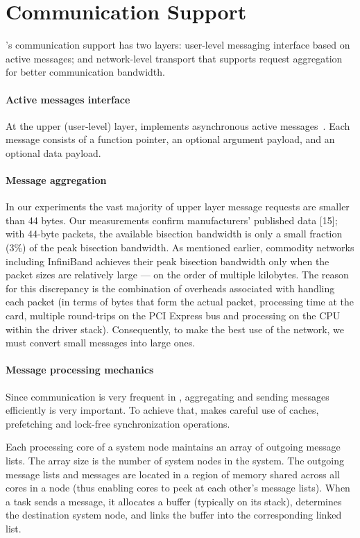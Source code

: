 \section{Communication Support}
\label{sec:communication}

\Grappa's communication support has two layers: user-level messaging interface
based on active messages; and network-level transport that supports request
aggregation for better communication bandwidth.

\paragraph{Active messages interface} At the upper (user-level) layer, \Grappa
implements asynchronous active messages~\cite{vonEicken92}. Each message
consists of a function pointer, an optional argument payload, and an optional
data payload. 

\paragraph{Message aggregation} In our experiments the vast majority of upper
layer message requests are smaller than 44 bytes. Our measurements confirm
manufacturers' published data [15]; with 44-byte packets, the available
bisection bandwidth is only a small fraction (3\%) of the peak bisection
bandwidth. As mentioned earlier, commodity networks including InfiniBand
achieves their peak bisection bandwidth only when the packet sizes are
relatively large --- on the order of multiple kilobytes. The reason for this
discrepancy is the combination of overheads associated with handling each
packet (in terms of bytes that form the actual packet, processing time at the
card, multiple round-trips on the PCI Express bus and processing on the CPU
within the driver stack). Consequently, to make the best use of the network,
we must convert small messages into large ones.

\paragraph{Message processing mechanics} Since communication is very frequent
in \Grappa, aggregating and sending messages efficiently is very important. To
achieve that, \Grappa makes careful use of caches, prefetching and lock-free
synchronization operations.

Each processing core of a system node maintains an array of outgoing message lists.  The array size is the number of system nodes in the \Grappa system.   The outgoing message lists and messages are located in a region of memory shared across all cores in a \Grappa node (thus enabling cores to peek at each other's message lists). When a task sends a message, it allocates a buffer (typically on its stack), determines the destination system node, and links the buffer into the corresponding linked list.

